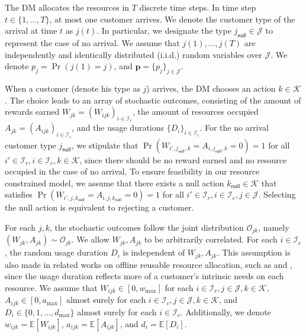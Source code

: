 \documentclass[letterpaper, 10 pt, conference]{ieeeconf}  %
\newcommand{\III}{\mathcal{I}}
\newcommand{\JJJ}{\mathcal{J}}
\newcommand{\KKK}{\mathcal{K}}
\newcommand{\OOO}{\mathcal{O}}
\theoremstyle{plain}
\theoremstyle{definition}
\theoremstyle{remark}
\begin{document}
The DM allocates the resources in $T$ discrete time steps. In time step $t \in \{1,\ldots,T\}$, at most one customer arrives. We denote the customer type of the arrival at time $t$ as $j(t)$. In particular, we designate the type $j_{\textsf{null}} \in \JJJ$ to represent the case of no arrival. We assume that $j(1), \ldots, j(T)$ are independently and identically distributed (i.i.d.) random variables over $\JJJ$. We denote $p_j = \Pr(j(1) = j)$, and $\mathbf{p} = \{p_j\}_{j\in \JJJ}$. 

When a customer (denote his type as $j$) arrives, the DM chooses an action $k\in \KKK$. The choice leads to an array of stochastic outcomes, consisting of the amount of rewards earned $W_{jk} = (W_{ijk})_{i \in \III_r}$, the amount of resources occupied $A_{jk} = (A_{ijk})_{i\in \III_c}$, and the usage durations $\{D_i\}_{i\in \III_c}$. For the no arrival customer type $j_{\textsf{null}}$, we stipulate that $\Pr(W_{i', j_{\textsf{null}}, k} = A_{i, j_{\textsf{null}}, k} = 0) = 1$ for all $i' \in \III_r, i\in \III_c, k\in \KKK$, since there should be no reward earned and no resource occupied in the case of no arrival. To ensure feasibility in our resource constrained model, we assume that there exists a null action $k_{\textsf{null}}\in \KKK$ that satisfies $\Pr(W_{i', j, k_{\textsf{null}}} = A_{i, j, k_{\textsf{null}}} = 0) = 1$ for all $i' \in \III_r, i\in \III_c, j\in \JJJ$. Selecting the null action is equivalent to rejecting a customer. 

For each $j, k$, the stochastic outcomes follow the joint distribution $\OOO_{jk}$, namely $(W_{jk}, A_{jk})\sim \OOO_{jk}$. We allow $W_{jk}, A_{jk}$ to be arbitrarily correlated. For each $i\in \III_c$, the random usage duration $D_i$ is independent of $W_{jk}, A_{jk}$. This assumption is also made in related works on offline reusable resource allocation, such as \cite{lei2020real} and \cite{rusmevichientong2020dynamic}, since the usage duration reflects more of a customer's intrinsic needs on each resource. We assume that $W_{ijk}\in [0,w_{\max}]$ for each $i \in \III_r, j\in \JJJ, k\in \KKK$, $A_{ijk}\in [0,a_{\max}]$ almost surely for each $i \in \III_c, j\in \JJJ, k\in \KKK$, and $D_i \in \{0,1, \ldots, d_{\max}\}$ almost surely for each $i \in \III_c$. Additionally, we denote $w_{ijk} = \mathbb{E}[W_{ijk}]$, $a_{ijk} = \mathbb{E}[A_{ijk}]$, and $d_i = \mathbb{E}[ D_i]$.
\end{document}
